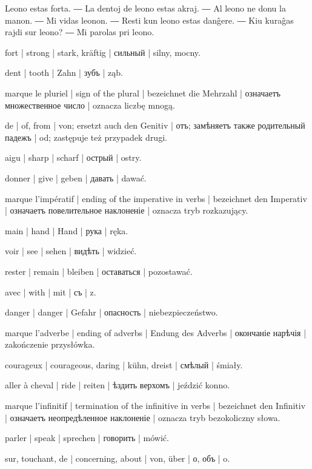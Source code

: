 
Leono estas forta. ― La dentoj de leono estas akraj. ― Al leono ne donu la manon. ― Mi vidas leonon. ― Resti kun leono estas danĝere. ― Kiu kuraĝas rajdi sur leono? ― Mi parolas pri leono.\enlargethispage{-\baselineskip}

\begin{ekzvocab}{1em}
 fort | strong | stark, kräftig | сильный | silny, mocny.

 dent | tooth | Zahn | зубъ | ząb.

 marque le pluriel | sign of the plural | bezeichnet die Mehrzahl | означаетъ множественное число | oznacza liczbę mnogą.

 de | of, from | von; ersetzt auch den Genitiv | отъ; замѣняетъ также родительный падежъ | od; zastępuje też przypadek drugi.

 aigu | sharp | scharf | острый | ostry.

 donner | give | geben | давать | dawać.

 marque l’impératif | ending of the imperative in verbs | bezeichnet den Imperativ | означаетъ повелительное наклоненіе | oznacza tryb rozkazujący.

 main | hand | Hand | рука | ręka.

 voir | see | sehen | видѣть | widzieć.

 rester | remain | bleiben | оставаться | pozostawać.

 avec | with | mit | съ | z.

 danger | danger | Gefahr | опасность | niebezpieczeństwo.

 marque l’adverbe | ending of adverbs | Endung des Adverbs | окончаніе нарѣчія | zakończenie przysłówka.

 courageux | courageous, daring | kühn, dreist | смѣлый | śmiały.

 aller à cheval | ride | reiten | ѣздить верхомъ | jeździć konno.

 marque l’infinitif | termination of the infinitive in verbs | bezeichnet den Infinitiv | означаетъ неопредѣленное наклоненіе | oznacza tryb bezokoliczny słowa.

 parler | speak | sprechen | говорить | mówić.

 sur, touchant, de | concerning, about | von, über | о, объ | o.

\end{ekzvocab}

